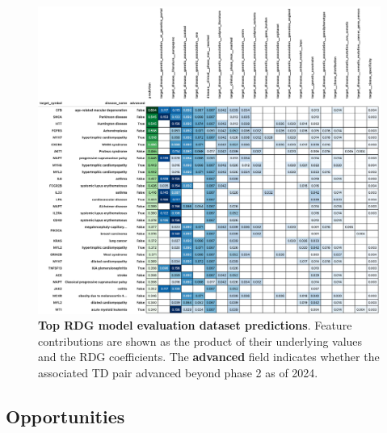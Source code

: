 \documentclass{article}
\begin{document}
\begin{figure}[H]
  \centering
  \captionsetup{width=.9\linewidth}
  \includegraphics[width=1\textwidth]{top_evaluation_predictions.png}
  \caption{
    \textbf{Top RDG model evaluation dataset predictions}.
    Feature contributions are shown as the product of their underlying values and the RDG coefficients. The \textbf{advanced} field indicates whether the associated TD pair advanced beyond phase 2 as of 2024.
  }
  \label{fig:top_evaluation_predictions}
\end{figure}


\subsection{Opportunities}


\end{document}
